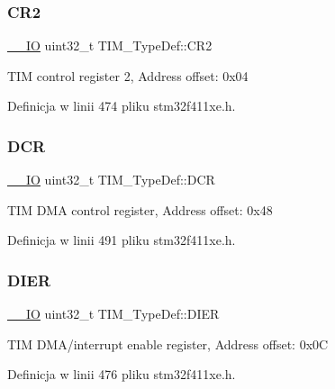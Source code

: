 \subsubsection{\texorpdfstring{C\+R2}{CR2}}
{\footnotesize\ttfamily \hyperlink{core__sc300_8h_aec43007d9998a0a0e01faede4133d6be}{\+\_\+\+\_\+\+IO} uint32\+\_\+t T\+I\+M\+\_\+\+Type\+Def\+::\+C\+R2}

T\+IM control register 2, Address offset\+: 0x04 

Definicja w linii 474 pliku stm32f411xe.\+h.

\mbox{\label{struct_t_i_m___type_def_a7efe9ea8067044cac449ada756ebc2d1}} 
\subsubsection{\texorpdfstring{D\+CR}{DCR}}
{\footnotesize\ttfamily \hyperlink{core__sc300_8h_aec43007d9998a0a0e01faede4133d6be}{\+\_\+\+\_\+\+IO} uint32\+\_\+t T\+I\+M\+\_\+\+Type\+Def\+::\+D\+CR}

T\+IM D\+MA control register, Address offset\+: 0x48 

Definicja w linii 491 pliku stm32f411xe.\+h.

\mbox{\label{struct_t_i_m___type_def_a22a33c78ca5bec0e3e8559164a82b8ef}} 
\subsubsection{\texorpdfstring{D\+I\+ER}{DIER}}
{\footnotesize\ttfamily \hyperlink{core__sc300_8h_aec43007d9998a0a0e01faede4133d6be}{\+\_\+\+\_\+\+IO} uint32\+\_\+t T\+I\+M\+\_\+\+Type\+Def\+::\+D\+I\+ER}

T\+IM D\+M\+A/interrupt enable register, Address offset\+: 0x0C 

Definicja w linii 476 pliku stm32f411xe.\+h.

\mbox{\label{struct_t_i_m___type_def_afb7114ac49dba07ba5d250c507dbf23d}} 
